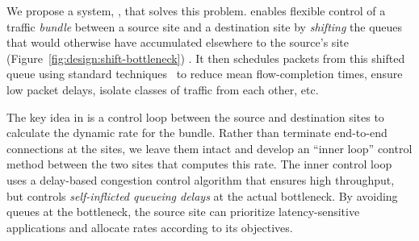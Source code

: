 

We propose a system, {\em \name}, that solves this problem. \name enables flexible control of a traffic {\em bundle} between a source site and a destination site by {\em shifting} the queues that would otherwise have accumulated elsewhere to the source's site (Figure~\ref{fig:design:shift-bottleneck}) . It then schedules packets from this shifted queue using standard techniques~\cite{diffserv, fair-queueing, sfq, pie, CoDel, fifoplus, virtualClocks, csfq, drr, red, ecn} to reduce mean flow-completion times, ensure low packet delays, isolate classes of traffic from each other, etc.



The key idea in \name is a control loop between the source and destination sites to calculate the dynamic rate for the bundle. Rather than terminate end-to-end connections at the sites, we leave them intact and develop an ``inner loop'' control method between the two sites that computes this rate. The inner control loop uses a delay-based congestion control algorithm that ensures high throughput, but controls {\em self-inflicted queueing delays} at the actual bottleneck. By avoiding queues at the bottleneck, the source site can prioritize latency-sensitive applications and allocate rates according to its objectives.

